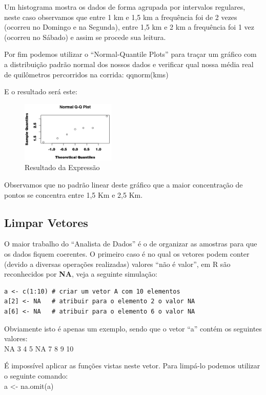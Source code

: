\documentclass[a4paper,11pt]{article}
\begin{document}
Um histograma mostra os dados de forma agrupada por intervalos regulares, neste caso observamos que entre 1 km e 1,5 km a frequência foi de 2 vezes (ocorreu no Domingo e na Segunda), entre 1,5 km e 2 km a frequência foi 1 vez (ocorreu no Sábado) e assim se procede sua leitura.

Por fim podemos utilizar o ``Normal-Quantile Plots'' para traçar um gráfico com a distribuição padrão normal dos nossos dados e verificar qual nossa média real de quilômetros percorridos na corrida:
{\ttfamily qqnorm(kms)}

E o resultado será este:
\begin{figure}[H]
	\centering
	\includegraphics[width=0.4\textwidth]{imagens/grafico04.png}
	\caption{Resultado da Expressão}
\end{figure}

Observamos que no padrão linear deste gráfico que a maior concentração de pontos se concentra entre 1,5 Km e 2,5 Km.

\subsection{Limpar Vetores}
O maior trabalho do ``Analista de Dados'' é o de organizar as amostras para que os dados fiquem coerentes. O primeiro caso é no qual os vetores podem conter (devido a diversas operações realizadas) valores ``não é valor'', em R são reconhecidos por \textbf{NA}, veja a seguinte simulação:
\begin{lstlisting}
a <- c(1:10) # criar um vetor A com 10 elementos
a[2] <- NA   # atribuir para o elemento 2 o valor NA
a[6] <- NA   # atribuir para o elemento 6 o valor NA
\end{lstlisting}

Obviamente isto é apenas um exemplo, sendo que o vetor ``a'' contém os seguintes valores: \\
{ NA  3  4  5 NA  7  8  9 10}

É impossível aplicar as funções vistas neste vetor. Para limpá-lo podemos utilizar o seguinte comando: \\
{\ttfamily a <- na.omit(a)}
\end{document}
